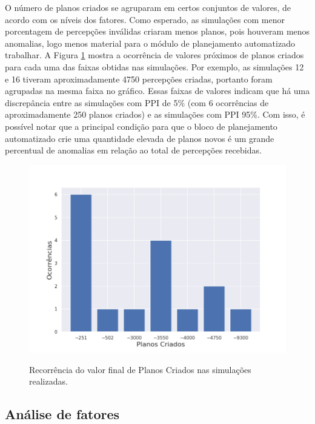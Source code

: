 O número de planos criados se agruparam em certos conjuntos de valores, de acordo com os níveis dos fatores. Como esperado, as simulações com menor porcentagem de percepções inválidas criaram menos planos, pois houveram menos anomalias, logo menos material para o módulo de planejamento automatizado trabalhar. A Figura \ref{fig:pc_occurrences} mostra a ocorrência de valores próximos de planos criados para cada uma das faixas obtidas nas simulações. Por exemplo, as simulações 12 e 16 tiveram aproximadamente 4750 percepções criadas, portanto foram agrupadas na mesma faixa no gráfico. Essas faixas de valores indicam que há uma discrepância entre as simulações com PPI de 5\% (com 6 ocorrências de aproximadamente 250 planos criados) e as simulações com PPI 95\%. Com isso, é possível notar que a principal condição para que o bloco de planejamento automatizado crie uma quantidade elevada de planos novos é um grande percentual de anomalias em relação ao total de percepções recebidas.

\begin{figure}[h!]
    \centering
    \caption{Recorrência do valor final de Planos Criados nas simulações realizadas.}
    \includegraphics[width=1\textwidth]{images/plans_created_occurrences.png}
    \label{fig:pc_occurrences}
\end{figure}

\subsection{Análise de fatores}

